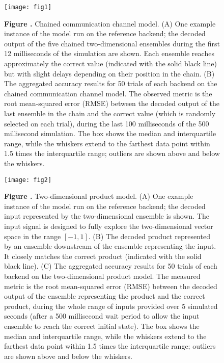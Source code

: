 \documentclass{frontiersSCNS}
\begin{document}
\begin{figure}[!ht]
\begin{center}
  \texttt{[image: fig1]}
\end{center}
\textbf{\label{fig:01} Figure .}
       {Chained communication channel model. (A) One example instance
         of the model run on the reference backend; the decoded output
         of the five chained two-dimensional ensembles during the first
         12 milliseconds of the simulation are shown.
         Each ensemble reaches approximately the correct value
         (indicated with the solid black line)
         but with slight delays depending on their position in the chain.
         (B) The aggregated accuracy results for
         50 trials of each backend on the
         chained communication channel model. The observed metric is the root
         mean-squared error (RMSE) between the decoded output of the last
         ensemble in the chain and the correct value (which is randomly
         selected on each trial), during the last 100 milliseconds of the
         500 millisecond simulation. The box shows the median and
         interquartile range, while the whiskers extend to the farthest
         data point within 1.5 times the interquartile range;
         outliers are shown above and below the whiskers.}
\end{figure}

\begin{figure}[!ht]
\begin{center}
  \texttt{[image: fig2]}
\end{center}
\textbf{\label{fig:02} Figure .}
       {Two-dimensional product model. (A) One example instance of the model
         run on the reference backend; the decoded input represented
         by the two-dimensional ensemble is shown. The input signal is
         designed to fully explore the two-dimensional vector space
         in the range $[-1, 1]$.
         (B) The decoded product represented by an ensemble downstream
         of the ensemble representing the input. It closely matches the
         correct product (indicated with the solid black line).
         (C) The aggregated accuracy results for 50 trials of
         each backend on the
         two-dimensional product model. The measured metric is the root
         mean-squared error (RMSE) between the decoded output of the ensemble
         representing the product and the correct product, during the whole
         range of inputs provided over 5 simulated seconds (after a 500
         millisecond wait period to allow the input ensemble to reach the
         correct initial state). The box shows the median and
         interquartile range, while the whiskers extend to the farthest
         data point within 1.5 times the interquartile range;
         outliers are shown above and below the whiskers.}
\end{figure}
\end{document}
